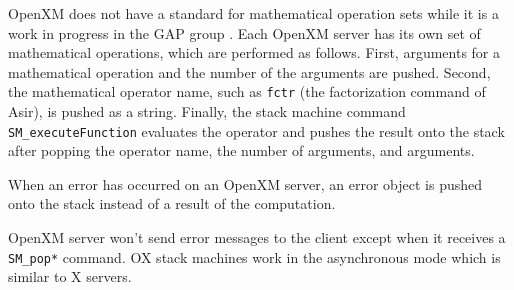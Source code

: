 OpenXM does not have a standard for mathematical operation sets
while it is a work in progress in the GAP group \cite{gap}.
Each OpenXM server has its own set of mathematical operations,
which are performed as follows.
First, arguments for a mathematical operation
and the number of the arguments are pushed.
Second, 
the mathematical operator name, 
such as {\tt fctr} (the factorization command of Asir),
is pushed as a string.
Finally, the stack machine command
{\tt SM\_executeFunction} evaluates the operator and
pushes the result onto the stack
after popping the operator name, the number of arguments,
and arguments.

When an error has occurred on an OpenXM server,
an error object is pushed onto the stack 
instead of a result of the computation.

OpenXM server won't send error messages to the client
except when it receives a {\tt SM\_pop*} command.
OX stack machines work in the asynchronous mode which is similar 
to X servers.





